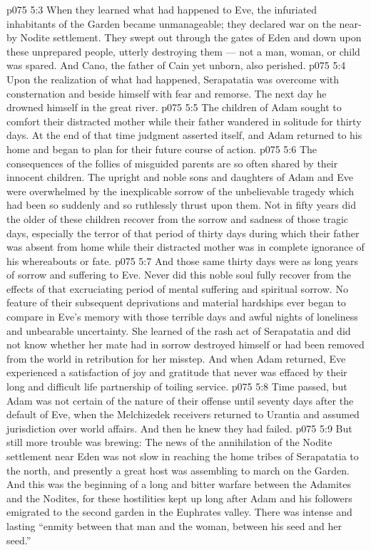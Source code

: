 \vs p075 5:3 When they learned what had happened to Eve, the infuriated inhabitants of the Garden became unmanageable; they declared war on the near\hyp{}by Nodite settlement. They swept out through the gates of Eden and down upon these unprepared people, utterly destroying them --- not a man, woman, or child was spared. And Cano, the father of Cain yet unborn, also perished.
\vs p075 5:4 Upon the realization of what had happened, Serapatatia was overcome with consternation and beside himself with fear and remorse. The next day he drowned himself in the great river.
\vs p075 5:5 The children of Adam sought to comfort their distracted mother while their father wandered in solitude for thirty days. At the end of that time judgment asserted itself, and Adam returned to his home and began to plan for their future course of action.
\vs p075 5:6 The consequences of the follies of misguided parents are so often shared by their innocent children. The upright and noble sons and daughters of Adam and Eve were overwhelmed by the inexplicable sorrow of the unbelievable tragedy which had been so suddenly and so ruthlessly thrust upon them. Not in fifty years did the older of these children recover from the sorrow and sadness of those tragic days, especially the terror of that period of thirty days during which their father was absent from home while their distracted mother was in complete ignorance of his whereabouts or fate.
\vs p075 5:7 And those same thirty days were as long years of sorrow and suffering to Eve. Never did this noble soul fully recover from the effects of that excruciating period of mental suffering and spiritual sorrow. No feature of their subsequent deprivations and material hardships ever began to compare in Eve’s memory with those terrible days and awful nights of loneliness and unbearable uncertainty. She learned of the rash act of Serapatatia and did not know whether her mate had in sorrow destroyed himself or had been removed from the world in retribution for her misstep. And when Adam returned, Eve experienced a satisfaction of joy and gratitude that never was effaced by their long and difficult life partnership of toiling service.
\vs p075 5:8 \pc Time passed, but Adam was not certain of the nature of their offense until seventy days after the default of Eve, when the Melchizedek receivers returned to Urantia and assumed jurisdiction over world affairs. And then he knew they had failed.
\vs p075 5:9 \pc But still more trouble was brewing: The news of the annihilation of the Nodite settlement near Eden was not slow in reaching the home tribes of Serapatatia to the north, and presently a great host was assembling to march on the Garden. And this was the beginning of a long and bitter warfare between the Adamites and the Nodites, for these hostilities kept up long after Adam and his followers emigrated to the second garden in the Euphrates valley. There was intense and lasting “enmity between that man and the woman, between his seed and her seed.”
